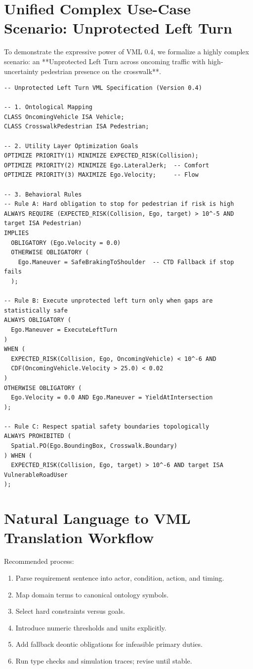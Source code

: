 \documentclass[11pt,a4paper]{article}
\begin{document}
\section{Unified Complex Use-Case Scenario: Unprotected Left Turn}

To demonstrate the expressive power of VML 0.4, we formalize a highly complex scenario: an **Unprotected Left Turn across oncoming traffic with high-uncertainty pedestrian presence on the crosswalk**.

\begin{lstlisting}
-- Unprotected Left Turn VML Specification (Version 0.4)

-- 1. Ontological Mapping
CLASS OncomingVehicle ISA Vehicle;
CLASS CrosswalkPedestrian ISA Pedestrian;

-- 2. Utility Layer Optimization Goals
OPTIMIZE PRIORITY(1) MINIMIZE EXPECTED_RISK(Collision);
OPTIMIZE PRIORITY(2) MINIMIZE Ego.LateralJerk;  -- Comfort
OPTIMIZE PRIORITY(3) MAXIMIZE Ego.Velocity;     -- Flow

-- 3. Behavioral Rules
-- Rule A: Hard obligation to stop for pedestrian if risk is high
ALWAYS REQUIRE (EXPECTED_RISK(Collision, Ego, target) > 10^-5 AND target ISA Pedestrian)
IMPLIES
  OBLIGATORY (Ego.Velocity = 0.0)
  OTHERWISE OBLIGATORY (
    Ego.Maneuver = SafeBrakingToShoulder  -- CTD Fallback if stop fails
  );

-- Rule B: Execute unprotected left turn only when gaps are statistically safe
ALWAYS OBLIGATORY (
  Ego.Maneuver = ExecuteLeftTurn
) 
WHEN (
  EXPECTED_RISK(Collision, Ego, OncomingVehicle) < 10^-6 AND 
  CDF(OncomingVehicle.Velocity > 25.0) < 0.02
)
OTHERWISE OBLIGATORY (
  Ego.Velocity = 0.0 AND Ego.Maneuver = YieldAtIntersection
);

-- Rule C: Respect spatial safety boundaries topologically
ALWAYS PROHIBITED (
  Spatial.PO(Ego.BoundingBox, Crosswalk.Boundary) 
) WHEN (
  EXPECTED_RISK(Collision, Ego, target) > 10^-6 AND target ISA VulnerableRoadUser
);
\end{lstlisting}

\section{Natural Language to VML Translation Workflow}
Recommended process:
\begin{enumerate}[leftmargin=*]
  \item Parse requirement sentence into actor, condition, action, and timing.
  \item Map domain terms to canonical ontology symbols.
  \item Select hard constraints versus goals.
  \item Introduce numeric thresholds and units explicitly.
  \item Add fallback deontic obligations for infeasible primary duties.
  \item Run type checks and simulation traces; revise until stable.
\end{enumerate}
\end{document}
